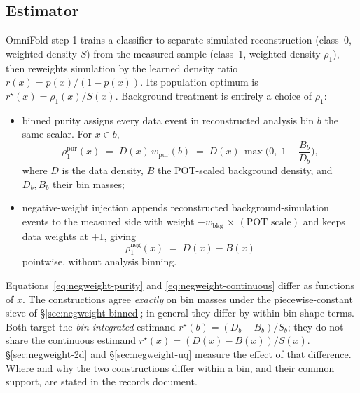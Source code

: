 \subsection{Estimator}
\label{sec:negweight-estimator}

OmniFold step 1 trains a classifier to separate simulated reconstruction (class~0, weighted density $S$) from the measured sample (class~1, weighted density $\rho_1$), then reweights simulation by the learned density ratio $r(x)=p(x)/(1-p(x))$. Its population optimum is $r^{\star}(x)=\rho_1(x)/S(x)$. Background treatment is entirely a choice of $\rho_1$:
\begin{itemize}
  \item binned purity assigns every data event in reconstructed analysis bin $b$ the same scalar. For $x\in b$,
    \begin{equation}
      \label{eq:negweight-purity}
      \rho_1^{\mathrm{pur}}(x)
      \;=\; D(x)\,w_{\mathrm{pur}}(b)
      \;=\; D(x)\,\max\!\Big(0,\;1-\frac{B_{b}}{D_{b}}\Big),
    \end{equation}
    where $D$ is the data density, $B$ the POT-scaled background density, and $D_{b},B_{b}$ their bin masses;
  \item negative-weight injection appends reconstructed background-simulation events to the measured side with weight $-w_{\mathrm{bkg}}\,\times\,(\text{POT scale})$ and keeps data weights at $+1$, giving
    \begin{equation}
      \label{eq:negweight-continuous}
      \rho_1^{\mathrm{neg}}(x) \;=\; D(x)-B(x)
    \end{equation}
    pointwise, without analysis binning.
\end{itemize}
Equations~\eqref{eq:negweight-purity} and \eqref{eq:negweight-continuous} differ as functions of $x$. The constructions agree \emph{exactly} on bin masses under the piecewise-constant sieve of \S\ref{sec:negweight-binned}; in general they differ by within-bin shape terms. Both target the \emph{bin-integrated} estimand $r^{\star}(b)=(D_{b}-B_{b})/S_{b}$; they do not share the continuous estimand $r^{\star}(x)=(D(x)-B(x))/S(x)$. \S\ref{sec:negweight-2d} and \S\ref{sec:negweight-uq} measure the effect of that difference. Where and why the two constructions differ within a bin, and their common support, are stated in the records document.

